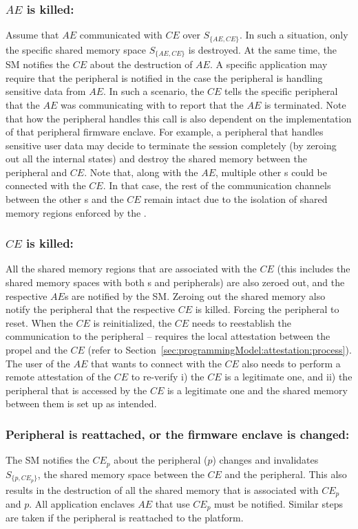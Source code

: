 \subsubsection{$AE$ is killed:} Assume that $AE$ communicated with $CE$ over $S_{\{AE, CE\}}$. In such a situation, only the specific shared memory space $S_{\{AE, CE\}}$ is destroyed. At the same time, the SM notifies the $CE$ about the destruction of $AE$. A specific application may require that the peripheral is notified in the case the peripheral is handling sensitive data from $AE$. In such a scenario, the $CE$ tells the specific peripheral that the $AE$ was communicating with to report that the $AE$ is terminated. Note that how the peripheral handles this call is also dependent on the implementation of that peripheral firmware enclave. For example, a peripheral that handles sensitive user data may decide to terminate the session completely (by zeroing out all the internal states) and destroy the shared memory between the peripheral and $CE$. Note that, along with the $AE$, multiple other \app{}s could be connected with the $CE$. In that case, the rest of the communication channels between the other \app{}s and the $CE$ remain intact due to the isolation of shared memory regions enforced by the \ce.
    
\subsubsection{$CE$ is killed:} All the shared memory regions that are associated with the $CE$ (this includes the shared memory spaces with both \app{}s and peripherals) are also zeroed out, and the respective $AE$s are notified by the SM. Zeroing out the shared memory also notify the peripheral that the respective $CE$ is killed. Forcing the peripheral to reset. When the $CE$ is reinitialized, the $CE$ needs to reestablish the communication to the peripheral -- requires the local attestation between the propel and the $CE$ (refer to Section~\ref{sec:programmingModel:attestation:process}). The user of the $AE$ that wants to connect with the $CE$ also needs to perform a remote attestation of the $CE$ to re-verify i) the $CE$ is a legitimate one, and ii) the peripheral that is accessed by the $CE$ is a legitimate one and the shared memory between them is set up as intended.
    
\subsubsection{Peripheral is reattached, or the firmware enclave is changed:} The SM notifies the $CE_p$ about the peripheral ($p$) changes and invalidates $S_{\{p, CE_p\}}$, the shared memory space between the $CE$ and the peripheral. This also results in the destruction of all the shared memory that is associated with $CE_p$ and $p$. All application enclaves $AE$ that use $CE_p$ must be notified. Similar steps are taken if the peripheral is reattached to the platform.

